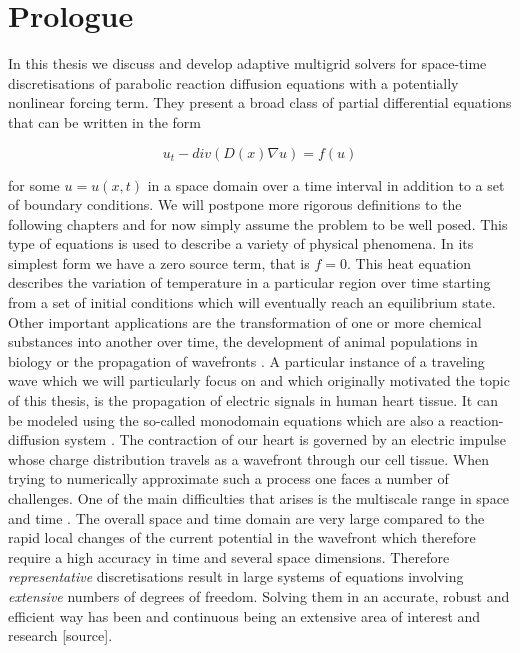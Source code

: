 \documentclass[../draft_1.tex]{subfiles}
\begin{document}
\chapter{Prologue}

In this thesis we  discuss and develop adaptive multigrid solvers for space-time discretisations of parabolic reaction diffusion equations with a potentially nonlinear forcing term. They present a broad class of partial differential equations that can be written in the form
\begin{ceqn}
\begin{equation}
u_t - div ( D(x) \nabla u) = f(u)
\end{equation}
\end{ceqn}
for some $u = u(x,t)$ in a space domain over a time interval in addition to a set of boundary conditions. We will postpone more rigorous definitions to the following chapters and for now simply assume the problem to be well posed. This type of equations is used to describe a variety of physical phenomena. In its simplest form we have a zero source term, that is $f = 0$. This heat equation describes the variation of temperature in a particular region over time starting from a set of initial conditions which will eventually reach an equilibrium state. Other important applications are the transformation of one or more chemical substances into another over time, the development of animal populations in biology \cite{cosner2008reaction} or the propagation of wavefronts \cite{zegeling2004adaptive}. A particular instance of a traveling wave which we will particularly focus on and which originally motivated the topic of this thesis, is the propagation of electric signals in human heart tissue. It can be modeled using the so-called monodomain equations which are also a reaction-diffusion system \cite{franzone2014mathematical}. The contraction of our heart is governed by an electric impulse whose charge distribution travels as a wavefront through our cell tissue. When trying to numerically approximate such a process one faces a number of challenges. One of the main difficulties that arises is the multiscale range in space and time \cite{colli2004parallel}. The overall space and time domain are very large compared to the rapid local changes of the current potential in the wavefront which therefore require a high accuracy in time and several space dimensions. Therefore \textit{representative} discretisations result in large systems of equations involving \textit{extensive} numbers of degrees of freedom. Solving them in an accurate, robust and efficient way has been and continuous being an extensive area of interest and research [source]. 
\end{document}
